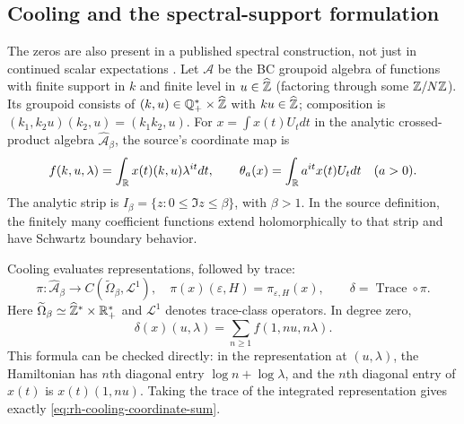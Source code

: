 \subsection{Cooling and the spectral-support formulation}

The zeros are also present in a published spectral construction, not just in
continued scalar expectations \cite[\S4.2--4.4]{ccmEndomotives}.
Let $\mathcal A$ be the BC groupoid algebra of functions with finite support
in $k$ and finite level in $u\in\widehat{\mathbb{Z}}$ (factoring through some
$\mathbb{Z}/N\mathbb{Z}$). Its groupoid consists of
$(k,u)\in\mathbb{Q}_+^*\times\widehat{\mathbb{Z}}$ with $ku\in\widehat{\mathbb{Z}}$;
composition is $(k_1,k_2u)(k_2,u)=(k_1k_2,u)$.
For $x=\int x(t)U_tdt$ in the analytic crossed-product algebra
$\widehat{\mathcal A}_\beta$, the source's coordinate map is
\begin{equation}
 f(k,u,\lambda)=\int_\mathbb R x(t)(k,u)\lambda^{it}dt,
 \qquad
 \theta_a(x)=\int_\mathbb R a^{it}x(t)U_tdt\quad(a>0).
 \label{eq:rh-crossed-fourier}
\end{equation}
The analytic strip is $I_\beta=\{z:0\le\Im z\le\beta\}$, with $\beta>1$.
In the source definition, the finitely many coefficient functions extend
holomorphically to that strip and have Schwartz boundary behavior.

Cooling evaluates representations, followed by trace:
\begin{equation}
 \pi:\widehat{\mathcal A}_\beta\longrightarrow
 C(\widetilde\Omega_\beta,\mathcal L^1),\quad
 \pi(x)(\varepsilon,H)=\pi_{\varepsilon,H}(x),\qquad
 \delta=\operatorname{Trace}\circ\pi.
 \label{eq:rh-cooling-map}
\end{equation}
Here $\widetilde\Omega_\beta\simeq\widehat{\mathbb{Z}}^*\times\mathbb R_+^*$ and
$\mathcal L^1$ denotes trace-class operators. In degree zero,
\begin{equation}
 \delta(x)(u,\lambda)=\sum_{n\ge1}f(1,nu,n\lambda).
 \label{eq:rh-cooling-coordinate-sum}
\end{equation}
This formula can be checked directly: in the representation at $(u,\lambda)$,
the Hamiltonian has $n$th diagonal entry $\log n+\log\lambda$, and the
$n$th diagonal entry of $x(t)$ is $x(t)(1,nu)$. Taking the trace of the
integrated representation gives exactly \eqref{eq:rh-cooling-coordinate-sum}.

